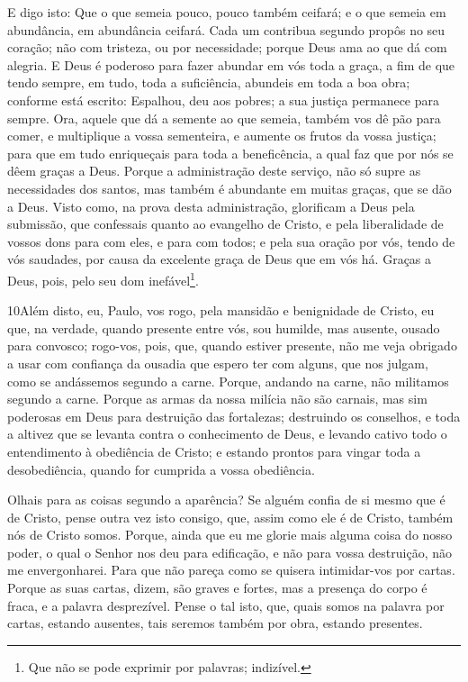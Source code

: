 E digo isto: Que o que semeia pouco, pouco também ceifará; e o que
semeia em abundância, em abundância ceifará. Cada um contribua
segundo propôs no seu coração; não com tristeza, ou por necessidade;
porque Deus ama ao que dá com alegria. E Deus é poderoso para
fazer abundar em vós toda a graça, a fim de que tendo sempre, em
tudo, toda a suficiência, abundeis em toda a boa obra; conforme
está escrito: Espalhou, deu aos pobres; a sua justiça permanece para
sempre. Ora, aquele que dá a semente ao que semeia, também
vos dê pão para comer, e multiplique a vossa sementeira, e aumente
os frutos da vossa justiça; para que em tudo enriqueçais para
toda a beneficência, a qual faz que por nós se dêem graças a Deus.
Porque a administração deste serviço, não só supre as
necessidades dos santos, mas também é abundante em muitas graças,
que se dão a Deus. Visto como, na prova desta administração,
glorificam a Deus pela submissão, que confessais quanto ao evangelho
de Cristo, e pela liberalidade de vossos dons para com eles, e para
com todos; e pela sua oração por vós, tendo de vós saudades,
por causa da excelente graça de Deus que em vós há. Graças a
Deus, pois, pelo seu dom inefável\footnote{Que não se pode exprimir
por palavras; indizível.}.

\medskip

\lettrine{10} Além disto, eu, Paulo, vos rogo, pela mansidão e
benignidade de Cristo, eu que, na verdade, quando presente entre
vós, sou humilde, mas ausente, ousado para convosco; rogo-vos,
pois, que, quando estiver presente, não me veja obrigado a usar com
confiança da ousadia que espero ter com alguns, que nos julgam, como
se andássemos segundo a carne. Porque, andando na carne, não
militamos segundo a carne. Porque as armas da nossa milícia não
são carnais, mas sim poderosas em Deus para destruição das
fortalezas; destruindo os conselhos, e toda a altivez que se
levanta contra o conhecimento de Deus, e levando cativo todo o
entendimento à obediência de Cristo; e estando prontos para
vingar toda a desobediência, quando for cumprida a vossa obediência.

Olhais para as coisas segundo a aparência? Se alguém confia de si
mesmo que é de Cristo, pense outra vez isto consigo, que, assim como
ele é de Cristo, também nós de Cristo somos. Porque, ainda que
eu me glorie mais alguma coisa do nosso poder, o qual o Senhor nos
deu para edificação, e não para vossa destruição, não me
envergonharei. Para que não pareça como se quisera intimidar-vos
por cartas. Porque as suas cartas, dizem, são graves e
fortes, mas a presença do corpo é fraca, e a palavra desprezível.
Pense o tal isto, que, quais somos na palavra por cartas,
estando ausentes, tais seremos também por obra, estando presentes.

